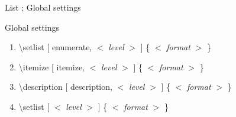 \documentclass[ aspectratio=149,  14pt,blue,xcolor=pdftex,dvipsnames,table,handout,notes]{beamer}
\begin{document}
		\begin{frame}[c]{List ; Global settings}

			\begin{block} {Global settings}
			\begin{enumerate}
			\item	\textbackslash setlist [ enumerate, $<$ \textit{level} $>$ ] \{ $<$ \textit{format} $>$ \}
			\item	\textbackslash itemize [ itemize, $<$ \textit{level} $>$ ] \{ $<$ \textit{format} $>$ \}
			\item	\textbackslash description [ description, $<$ \textit{level} $>$ ] \{ $<$ \textit{format} $>$ \}
			\item	\textbackslash setlist [ $<$ \textit{level} $>$ ] \{ $<$ \textit{format} $>$ \}
			\end{enumerate}
			\end{block}

		
		\end{frame}





\end{document}
